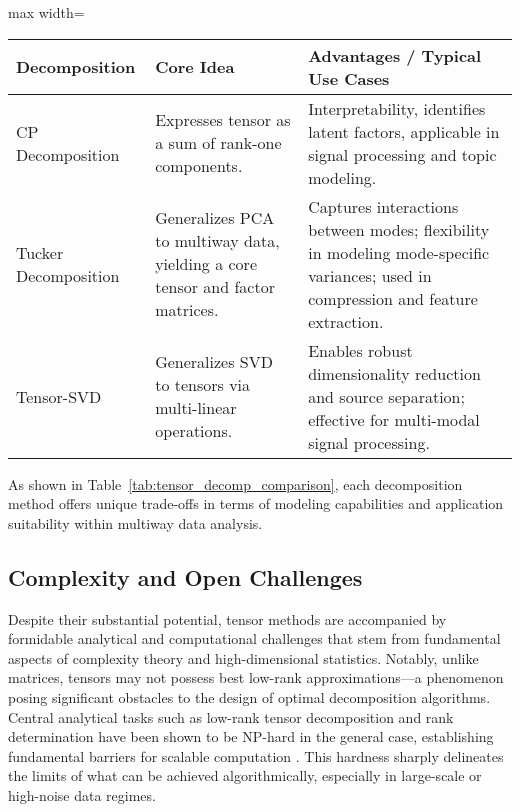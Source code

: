 \documentclass[sigconf]{acmart}
\begin{document}
\begin{table*}[htbp]
\centering
\caption{Comparison of Core Tensor Decomposition Techniques}
\label{tab:tensor_decomp_comparison}
\begin{adjustbox}{max width=\textwidth}
\begin{tabular}{lll}
\toprule
\textbf{Decomposition} & \textbf{Core Idea} & \textbf{Advantages / Typical Use Cases} \\
\midrule
CP Decomposition & Expresses tensor as a sum of rank-one components. & Interpretability, identifies latent factors, applicable in signal processing and topic modeling. \\
Tucker Decomposition & Generalizes PCA to multiway data, yielding a core tensor and factor matrices. & Captures interactions between modes; flexibility in modeling mode-specific variances; used in compression and feature extraction. \\
Tensor-SVD & Generalizes SVD to tensors via multi-linear operations. & Enables robust dimensionality reduction and source separation; effective for multi-modal signal processing. \\
\bottomrule
\end{tabular}
\end{adjustbox}
\end{table*}

As shown in Table~\ref{tab:tensor_decomp_comparison}, each decomposition method offers unique trade-offs in terms of modeling capabilities and application suitability within multiway data analysis.

\subsection{Complexity and Open Challenges}

Despite their substantial potential, tensor methods are accompanied by formidable analytical and computational challenges that stem from fundamental aspects of complexity theory and high-dimensional statistics. Notably, unlike matrices, tensors may not possess best low-rank approximations—a phenomenon posing significant obstacles to the design of optimal decomposition algorithms. Central analytical tasks such as low-rank tensor decomposition and rank determination have been shown to be NP-hard in the general case, establishing fundamental barriers for scalable computation \cite{ref104}. This hardness sharply delineates the limits of what can be achieved algorithmically, especially in large-scale or high-noise data regimes.
\end{document}
